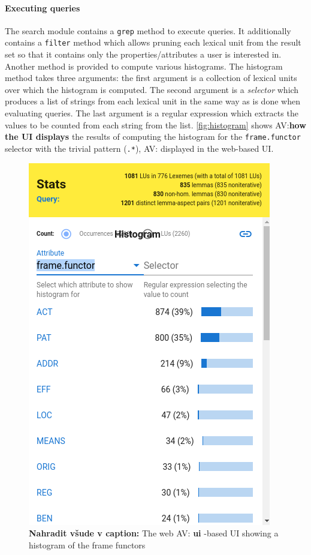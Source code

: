\documentclass[10pt, a4paper]{article}
\newcommand{\py}[1]{{\tt #1}}
\newcommand{\av}[1]{{\color{ansa} AV: #1}}
\newcommand{\avout}[2][]{{\color{ansa} AV:}{\color{lightgray}\textbf{#2}} {\color{ansa} #1}}
\begin{document}
\paragraph{Executing queries}
The search module contains a \py{grep} method to execute queries. It additionally contains a \py{filter}
method which allows pruning each lexical unit from the result set so that it contains only the properties/attributes a user is interested in. Another method is provided to compute various histograms.
The histogram method takes three arguments: the first argument is a collection of lexical units over which the histogram is computed. The second argument is a \emph{selector} which produces a list of strings
from each lexical unit in the same way as is done when evaluating queries. The last argument is a
regular expression which extracts the values to be counted from each string from the list. \autoref{fig:histogram}
shows \avout{how the UI displays} the results of computing the histogram for the {\tt frame.functor} selector with
the trivial pattern ({\tt .*}),
\av{displayed in the web-based UI}.
\begin{figure}
    \includegraphics[width=\hsize]{images/histogram.png}
    \caption{\label{fig:histogram}\textbf{Nahradit všude v caption:} The web\avout[-based UI]{ ui} showing a histogram of the frame functors}
\end{figure}
\end{document}
